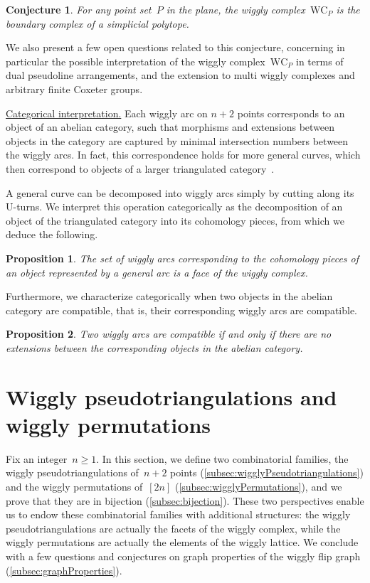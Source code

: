 \documentclass{amsart}
\newtheorem*{proposition*}{Proposition}%
\newtheorem*{conjecture*}{Conjecture}%
\theoremstyle{definition}
\newcommand{\para}[1]{\smallskip\noindent\uline{#1.}} %
\newcommand{\wigglyComplex}{\mathrm{WC}} %
\begin{document}
\begin{conjecture*}
For any point set~$P$ in the plane, the wiggly complex~$\wigglyComplex_P$ is the boundary complex of a simplicial polytope.
\end{conjecture*}

We also present a few open questions related to this conjecture, concerning in particular the possible interpretation of the wiggly complex~$\wigglyComplex_P$ in terms of dual pseudoline arrangements, and the extension to multi wiggly complexes and arbitrary finite Coxeter groups.

\pagebreak
\para{Categorical interpretation}
Each wiggly arc on \(n+2\) points corresponds to an object of an abelian category, such that morphisms and extensions between objects in the category are captured by minimal intersection numbers between the wiggly arcs.
In fact, this correspondence holds for more general curves, which then correspond to objects of a larger triangulated category~\cite{kho.sei:02}.

A general curve can be decomposed into wiggly arcs simply by cutting along its U-turns.
We interpret this operation categorically as the decomposition of an object of the triangulated category into its cohomology pieces, from which we deduce the following.

\begin{proposition*}
The set of wiggly arcs corresponding to the cohomology pieces of an object represented by a general arc is a face of the wiggly complex.
\end{proposition*}

Furthermore, we characterize categorically when two objects in the abelian category are compatible, that is, their corresponding wiggly arcs are compatible.

\begin{proposition*}
Two wiggly arcs are compatible if and only if there are no extensions between the corresponding objects in the abelian category.
\end{proposition*}


\section{Wiggly pseudotriangulations and wiggly permutations}
\label{sec:combinatorics}

Fix an integer~$n \ge 1$.
In this section, we define two combinatorial families, the wiggly pseudotriangulations of~$n+2$ points (\cref{subsec:wigglyPseudotriangulations}) and the wiggly permutations of~$[2n]$ (\cref{subsec:wigglyPermutations}), and we prove that they are in bijection (\cref{subsec:bijection}).
These two perspectives enable us to endow these combinatorial families with additional structures: the wiggly pseudotriangulations are actually the facets of the wiggly complex, while the wiggly permutations are actually the elements of the wiggly lattice.
We conclude with a few questions and conjectures on graph properties of the wiggly flip graph (\cref{subsec:graphProperties}).
\end{document}
